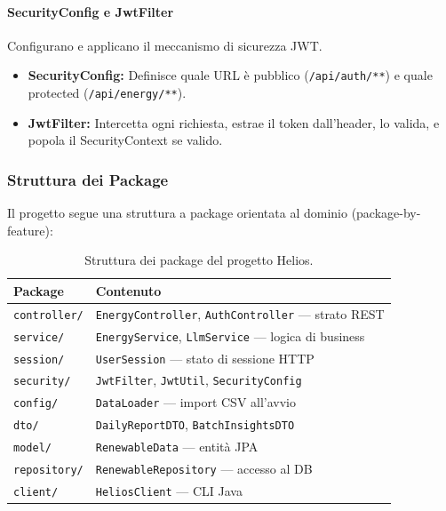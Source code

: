 \documentclass[a4paper,12pt]{report}
\begin{document}
\paragraph{SecurityConfig e JwtFilter}
Configurano e applicano il meccanismo di sicurezza JWT.
\begin{itemize}
    \item \textbf{SecurityConfig:} Definisce quale URL è pubblico (\texttt{/api/auth/**}) e quale protected (\texttt{/api/energy/**}).
    \item \textbf{JwtFilter:} Intercetta ogni richiesta, estrae il token dall'header, lo valida, e popola il SecurityContext se valido.
\end{itemize}

\subsubsection{Struttura dei Package}
Il progetto segue una struttura a package orientata al dominio (package-by-feature):

\begin{table}[H]
    \centering
    \begin{tabular}{ll}
        \toprule
        \textbf{Package} & \textbf{Contenuto} \\
        \midrule
        \texttt{controller/} & \texttt{EnergyController}, \texttt{AuthController} — strato REST \\
        \texttt{service/} & \texttt{EnergyService}, \texttt{LlmService} — logica di business \\
        \texttt{session/} & \texttt{UserSession} — stato di sessione HTTP \\
        \texttt{security/} & \texttt{JwtFilter}, \texttt{JwtUtil}, \texttt{SecurityConfig} \\
        \texttt{config/} & \texttt{DataLoader} — import CSV all'avvio \\
        \texttt{dto/} & \texttt{DailyReportDTO}, \texttt{BatchInsightsDTO} \\
        \texttt{model/} & \texttt{RenewableData} — entità JPA \\
        \texttt{repository/} & \texttt{RenewableRepository} — accesso al DB \\
        \texttt{client/} & \texttt{HeliosClient} — CLI Java \\
        \bottomrule
    \end{tabular}
    \caption{Struttura dei package del progetto Helios.}
\end{table}
\end{document}
